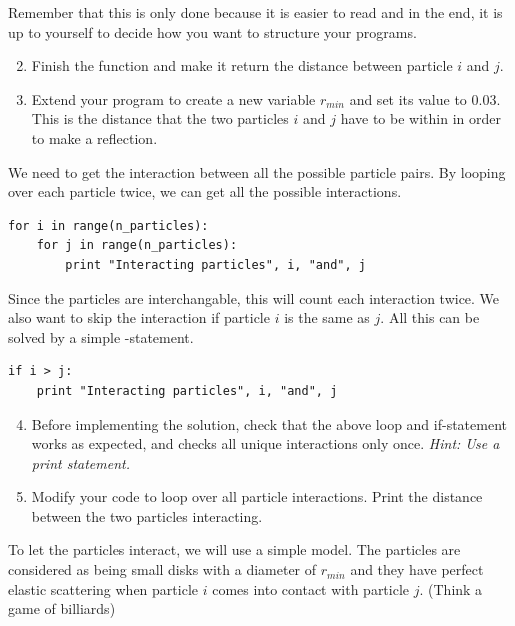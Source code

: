 \documentclass{article}
\begin{document}
Remember that this is only done because it is easier to read and in
the end, it is up to yourself to decide how you want to structure your
programs.

\begin{enumerate}
  \setcounter{enumi}{1}
  \item Finish the function  and make it return
    the distance  between particle $i$ and $j$.

  \item Extend your program to create a new variable $r_{min}$ and set its
    value to 0.03.
    This is the distance that the two particles $i$ and $j$ have to be within
    in order to make a reflection.


\end{enumerate}

We need to get the interaction between all the possible particle pairs.
By looping over each particle twice, we can get all the possible interactions.

\begin{lstlisting}
for i in range(n_particles):
    for j in range(n_particles):
        print "Interacting particles", i, "and", j
\end{lstlisting}

Since the particles are interchangable, this will count each interaction twice.
We also want to skip the interaction if particle $i$ is the same as $j$.
All this can be solved by a simple -statement.

\begin{lstlisting}
if i > j:
    print "Interacting particles", i, "and", j

\end{lstlisting}

\begin{enumerate}
  \setcounter{enumi}{3}
  \item Before implementing the solution, check that the above loop and
    if-statement works as expected, and checks all unique interactions only once. {\em Hint: Use
    a print statement.}

  \item Modify your code to loop over all particle interactions. Print the
    distance between the two particles interacting.

\end{enumerate}

To let the particles interact, we will use a simple model. The
particles are considered as being small disks with a diameter of $r_{min}$ and they have
perfect elastic scattering when particle $i$ comes into contact with particle $j$.
(Think a game of billiards)
\end{document}
